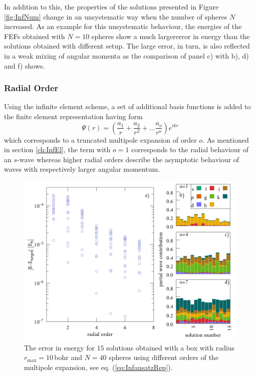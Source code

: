 In addition to this, the properties of the solutions presented in Figure \ref{fig:InfNum} change in an unsystematic way when the number of spheres $N$ increased.
As an example for this unsystematic behaviour, the energies of the FEFs obtained with $N=10$ spheres show a much largererror in energy than the solutions obtained with different setup.
The large error, in turn, is also reflected in a weak mixing of angular momenta as the comparison of panel c) with b), d) and f) shows.

\subsubsection{Radial Order}
Using the infinite element scheme, a set of additional basis functions is added to the finite element representation having form
\begin{equation} \label{eq:infAnsatzRep}
\Psi(r) = \left(\frac{a_1}{r} +\frac{a_2}{r^2} + \hdots \frac{a_{o}}{r^o} \right) e^{ikr}
\end{equation}
which corresponds to a truncated multipole expansion of order $o$.
As mentioned in section \ref{ch:InfEl}, the term with $o=1$ corresponds to the radial behaviour of an $s$-wave whereas higher radial orders describe the asymptotic behaviour of waves with respectively larger angular momentum.
\begin{figure}[h]
\includegraphics[width=\textwidth]{Figures/BC/OrdInfEL}
\caption{The error in energy for $15$ solutions obtained with a box with radius $r_\text{max}=10\,$bohr and $N=40$ spheres using different orders of the multipole expansion, see eq. (\ref{eq:InfansatzRep}).}
\label{fig:InfOrd}
\end{figure}


